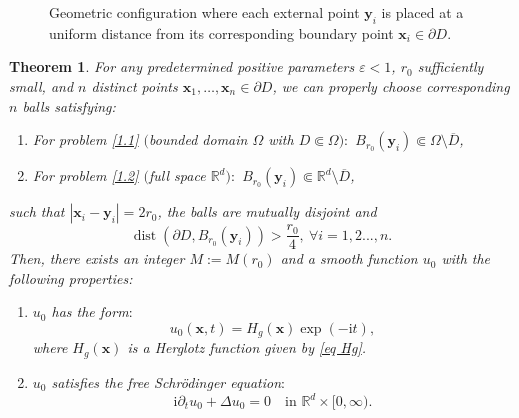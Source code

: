 \documentclass[11pt,reqno,oneside]{amsart}
\numberwithin{equation}{section}
\newtheorem{theorem}{Theorem}[section]
\theoremstyle{definition}
\theoremstyle{remark}
\numberwithin{equation}{section}
\def\dist{\mathrm{dist}}
\begin{document}
\begin{figure}[htbp]
	\caption{Geometric configuration where each external point $\mathbf{y}_i$ is placed at a uniform distance from its corresponding boundary point $\mathbf{x}_i \in \partial D$.}
	\label{fig:geometry_uniform}
\end{figure}
	
	\begin{theorem}\label{thm:main_result}
		For any predetermined positive parameters $\varepsilon < 1$, $r_0$ sufficiently small, and $n$ distinct points $\mathbf{x}_1,\dots,\mathbf{x}_n \in \partial D$, we can properly choose corresponding $n$ balls satisfying:
		\begin{enumerate}
			\renewcommand{\labelenumi}{(\roman{enumi})}
			\item For problem \eqref{1.1} $($bounded domain $\Omega$ with $D \Subset \Omega):$ $B_{r_0}(\mathbf{y}_i) \Subset \Omega \setminus \overline{D}$,
			\item For problem \eqref{1.2} $($full space $\mathbb{R}^d ):$ $B_{r_0}(\mathbf{y}_i) \Subset \mathbb{R}^d \setminus \overline{D}$,
		\end{enumerate}
		such that $|\mathbf{x}_i - \mathbf{y}_i| = 2r_0$, the balls are mutually disjoint and
		$$
		\operatorname{dist}(\partial D, B_{r_0}(\mathbf{y}_i))>\frac{r_0}{4},\ \forall i=1,2...,n.
		$$
	Then, there exists an integer $M := M(r_0)$ and a smooth function $u_0$ with the following properties:
		\begin{enumerate}
			\item $u_0$ has the form$:$
			\begin{equation*}
				u_0(\mathbf{x},t) = H_g(\mathbf{x})\exp(-\mathrm{i} t),
			\end{equation*}
			where $ H_g(\mathbf{x})$ is a Herglotz function given by \eqref{eq Hg}. 
			
			\item $u_0$ satisfies the free Schr\"odinger equation$:$
			\[
			\mathrm{i}\partial_{t} u_0 + \Delta u_0 = 0 \quad \text{in } \mathbb{R}^d \times [0,\infty).
			\]
			

\end{enumerate}
\end{theorem}
\end{document}
